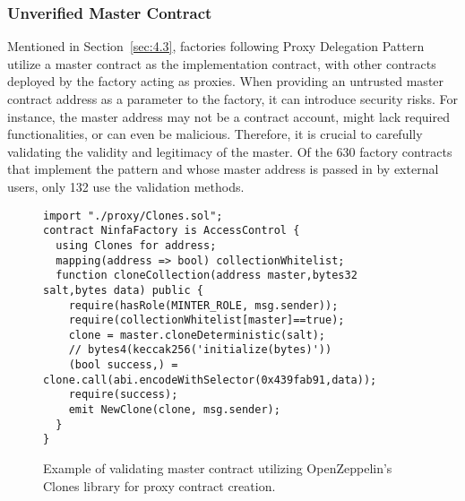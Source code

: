 \documentclass[acmsmall,screen]{acmart}
\begin{document}
	\subsubsection{Unverified Master Contract}\label{sec:unvermaster}
	Mentioned in Section~\ref{sec:4.3}, factories following Proxy Delegation Pattern utilize a master contract as the implementation contract, with other contracts deployed by the factory acting as proxies. When providing an untrusted master contract address as a parameter to the factory, it can introduce security risks. For instance, the master address may not be a contract account, might lack required functionalities, or can even be malicious. Therefore, it is crucial to carefully validating the validity and legitimacy of the master. Of the 630 factory contracts that implement the pattern and whose master address is passed in by external users, only 132 use the validation methods.
	\begin{figure}[htbp]
		\begin{minipage}{\linewidth}
			\begin{lstlisting}
import "./proxy/Clones.sol";
contract NinfaFactory is AccessControl {
  using Clones for address;
  mapping(address => bool) collectionWhitelist;
  function cloneCollection(address master,bytes32 salt,bytes data) public {
    require(hasRole(MINTER_ROLE, msg.sender));
    require(collectionWhitelist[master]==true);
    clone = master.cloneDeterministic(salt);
    // bytes4(keccak256('initialize(bytes)'))
    (bool success,) = clone.call(abi.encodeWithSelector(0x439fab91,data));
    require(success);
    emit NewClone(clone, msg.sender);
  }
}
			\end{lstlisting}
		\end{minipage}
		\caption{Example of validating master contract utilizing OpenZeppelin's Clones library for proxy contract creation.}
		\label{lst:checkmaster}
	\end{figure}
\end{document}
